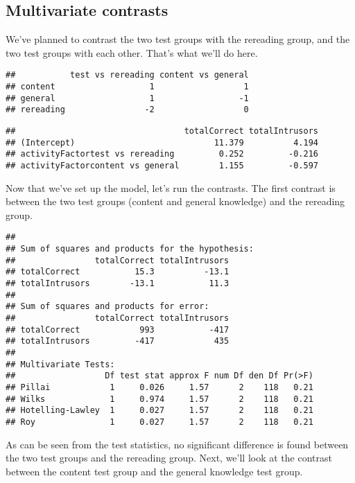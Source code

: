 \documentclass[11pt,]{article}
\begin{document}
\hypertarget{multivariate-contrasts}{%
\subsection{Multivariate contrasts}\label{multivariate-contrasts}}

We've planned to contrast the two test groups with the rereading group,
and the two test groups with each other. That's what we'll do here.

\begin{verbatim}
##           test vs rereading content vs general
## content                   1                  1
## general                   1                 -1
## rereading                -2                  0
\end{verbatim}

\begin{verbatim}
##                                  totalCorrect totalIntrusors
## (Intercept)                            11.379          4.194
## activityFactortest vs rereading         0.252         -0.216
## activityFactorcontent vs general        1.155         -0.597
\end{verbatim}

Now that we've set up the model, let's run the contrasts. The first
contrast is between the two test groups (content and general knowledge)
and the rereading group.

\begin{verbatim}
## 
## Sum of squares and products for the hypothesis:
##                totalCorrect totalIntrusors
## totalCorrect           15.3          -13.1
## totalIntrusors        -13.1           11.3
## 
## Sum of squares and products for error:
##                totalCorrect totalIntrusors
## totalCorrect            993           -417
## totalIntrusors         -417            435
## 
## Multivariate Tests: 
##                  Df test stat approx F num Df den Df Pr(>F)
## Pillai            1     0.026     1.57      2    118   0.21
## Wilks             1     0.974     1.57      2    118   0.21
## Hotelling-Lawley  1     0.027     1.57      2    118   0.21
## Roy               1     0.027     1.57      2    118   0.21
\end{verbatim}

As can be seen from the test statistics, no significant difference is
found between the two test groups and the rereading group. Next, we'll
look at the contrast between the content test group and the general
knowledge test group.
\end{document}
